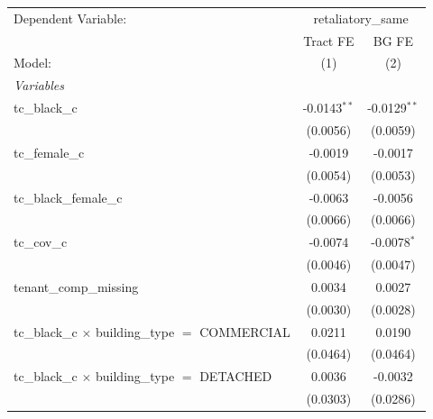 \begingroup
\centering
\begin{tabular}{lcc}
   \tabularnewline \midrule \midrule
   Dependent Variable: & \multicolumn{2}{c}{retaliatory\_same}\\
                                                                       & Tract FE       & BG FE \\   
   Model:                                                              & (1)            & (2)\\  
   \midrule
   \emph{Variables}\\
   tc\_black\_c                                                        & -0.0143$^{**}$ & -0.0129$^{**}$\\   
                                                                       & (0.0056)       & (0.0059)\\   
   tc\_female\_c                                                       & -0.0019        & -0.0017\\   
                                                                       & (0.0054)       & (0.0053)\\   
   tc\_black\_female\_c                                                & -0.0063        & -0.0056\\   
                                                                       & (0.0066)       & (0.0066)\\   
   tc\_cov\_c                                                          & -0.0074        & -0.0078$^{*}$\\   
                                                                       & (0.0046)       & (0.0047)\\   
   tenant\_comp\_missing                                               & 0.0034         & 0.0027\\   
                                                                       & (0.0030)       & (0.0028)\\   
   tc\_black\_c $\times$ building\_type $=$ COMMERCIAL                 & 0.0211         & 0.0190\\   
                                                                       & (0.0464)       & (0.0464)\\   
   tc\_black\_c $\times$ building\_type $=$ DETACHED                   & 0.0036         & -0.0032\\   
                                                                       & (0.0303)       & (0.0286)\\   

\end{tabular}

